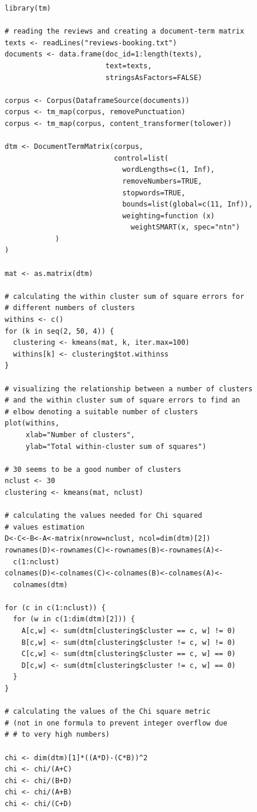 \documentclass[11pt,openany,executivepaper]{book}
\begin{document}
\begin{verbatim}
library(tm)

# reading the reviews and creating a document-term matrix
texts <- readLines("reviews-booking.txt")
documents <- data.frame(doc_id=1:length(texts),
                        text=texts,
                        stringsAsFactors=FALSE)

corpus <- Corpus(DataframeSource(documents))
corpus <- tm_map(corpus, removePunctuation)
corpus <- tm_map(corpus, content_transformer(tolower))

dtm <- DocumentTermMatrix(corpus,
                          control=list(
                            wordLengths=c(1, Inf),
                            removeNumbers=TRUE,
                            stopwords=TRUE,
                            bounds=list(global=c(11, Inf)),
                            weighting=function (x)
                              weightSMART(x, spec="ntn")
            )
)

mat <- as.matrix(dtm)

# calculating the within cluster sum of square errors for
# different numbers of clusters
withins <- c()
for (k in seq(2, 50, 4)) {
  clustering <- kmeans(mat, k, iter.max=100)
  withins[k] <- clustering$tot.withinss
}

# visualizing the relationship between a number of clusters
# and the within cluster sum of square errors to find an
# elbow denoting a suitable number of clusters
plot(withins, 
     xlab="Number of clusters",
     ylab="Total within-cluster sum of squares")

# 30 seems to be a good number of clusters
nclust <- 30
clustering <- kmeans(mat, nclust)

# calculating the values needed for Chi squared
# values estimation
D<-C<-B<-A<-matrix(nrow=nclust, ncol=dim(dtm)[2])
rownames(D)<-rownames(C)<-rownames(B)<-rownames(A)<-
  c(1:nclust)
colnames(D)<-colnames(C)<-colnames(B)<-colnames(A)<-
  colnames(dtm)

for (c in c(1:nclust)) {
  for (w in c(1:dim(dtm)[2])) {
    A[c,w] <- sum(dtm[clustering$cluster == c, w] != 0)
    B[c,w] <- sum(dtm[clustering$cluster != c, w] != 0)
    C[c,w] <- sum(dtm[clustering$cluster == c, w] == 0)
    D[c,w] <- sum(dtm[clustering$cluster != c, w] == 0)
  }
}

# calculating the values of the Chi square metric
# (not in one formula to prevent integer overflow due
# # to very high numbers)

chi <- dim(dtm)[1]*((A*D)-(C*B))^2
chi <- chi/(A+C)
chi <- chi/(B+D)
chi <- chi/(A+B)
chi <- chi/(C+D)


\end{verbatim}
\end{document}
